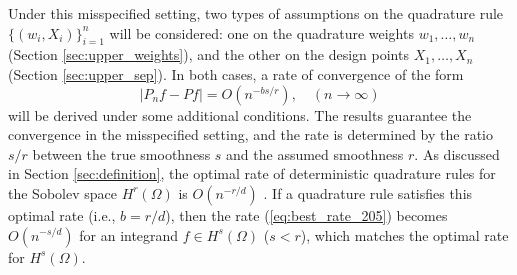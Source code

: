 \documentclass[11pt]{article}
\theoremstyle{remark}
\theoremstyle{example}
\theoremstyle{remark}
\begin{document}
Under this misspecified setting, two types of assumptions on the quadrature rule $\{ (w_i,X_i) \}_{i=1}^n$ will be considered: one on the quadrature weights $w_1,\dots,w_n$ (Section \ref{sec:upper_weights}), and the other on the design points $X_1,\dots,X_n$ (Section \ref{sec:upper_sep}). 
In both cases, a rate of convergence of the form 
\begin{equation} \label{eq:best_rate_205}
| P_n f - P f | = O(n^{-bs/r}), \quad (n\to \infty)
\end{equation}
will be derived under some additional conditions.
The results guarantee the convergence in the misspecified setting, and the rate is determined by the ratio $s/r$ between the true smoothness $s$ and the assumed smoothness $r$.
As discussed in Section \ref{sec:definition}, the optimal rate of deterministic quadrature rules for the Sobolev space $H^r(\Omega)$ is $O(n^{-r/d})$ \cite{Nov88}.  
If a quadrature rule satisfies this optimal rate (i.e., $b=r/d$), then the rate (\ref{eq:best_rate_205}) becomes $O(n^{-s/d})$ for an integrand $f\in H^s(\Omega)$ ($s<r$), which matches the optimal rate for $H^s(\Omega)$.  
\end{document}
